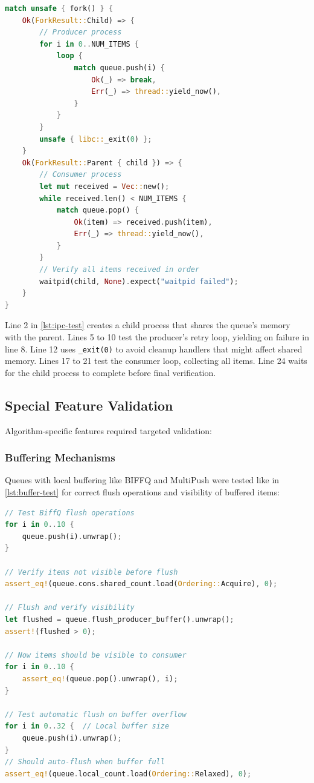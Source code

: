 \begin{lstlisting}[language=Rust, style=boxed, caption={IPC test structure}, label={lst:ipc-test}]
match unsafe { fork() } {
    Ok(ForkResult::Child) => {
        // Producer process
        for i in 0..NUM_ITEMS {
            loop {
                match queue.push(i) {
                    Ok(_) => break,
                    Err(_) => thread::yield_now(),
                }
            }
        }
        unsafe { libc::_exit(0) };
    }
    Ok(ForkResult::Parent { child }) => {
        // Consumer process
        let mut received = Vec::new();
        while received.len() < NUM_ITEMS {
            match queue.pop() {
                Ok(item) => received.push(item),
                Err(_) => thread::yield_now(),
            }
        }
        // Verify all items received in order
        waitpid(child, None).expect("waitpid failed");
    }
}
\end{lstlisting}

Line 2 in \cref{lst:ipc-test} creates a child process that shares the queue's memory with the parent. Lines 5 to 10 test the producer's retry loop, yielding on failure in line 8. Line 12 uses \texttt{\_exit(0)} to avoid cleanup handlers that might affect shared memory. Lines 17 to 21 test the consumer loop, collecting all items. Line 24 waits for the child process to complete before final verification.

\subsection{Special Feature Validation}
Algorithm-specific features required targeted validation:

\subsubsection{Buffering Mechanisms}
Queues with local buffering like \ac{BIFFQ} and MultiPush were tested like in \cref{lst:buffer-test} for correct flush operations and visibility of buffered items:

\begin{lstlisting}[language=Rust, style=boxed, caption={Buffer mechanism test}, label={lst:buffer-test}]
// Test BiffQ flush operations
for i in 0..10 {
    queue.push(i).unwrap();
}

// Verify items not visible before flush
assert_eq!(queue.cons.shared_count.load(Ordering::Acquire), 0);

// Flush and verify visibility
let flushed = queue.flush_producer_buffer().unwrap();
assert!(flushed > 0);

// Now items should be visible to consumer
for i in 0..10 {
    assert_eq!(queue.pop().unwrap(), i);
}

// Test automatic flush on buffer overflow
for i in 0..32 {  // Local buffer size
    queue.push(i).unwrap();
}
// Should auto-flush when buffer full
assert_eq!(queue.local_count.load(Ordering::Relaxed), 0);
\end{lstlisting}

